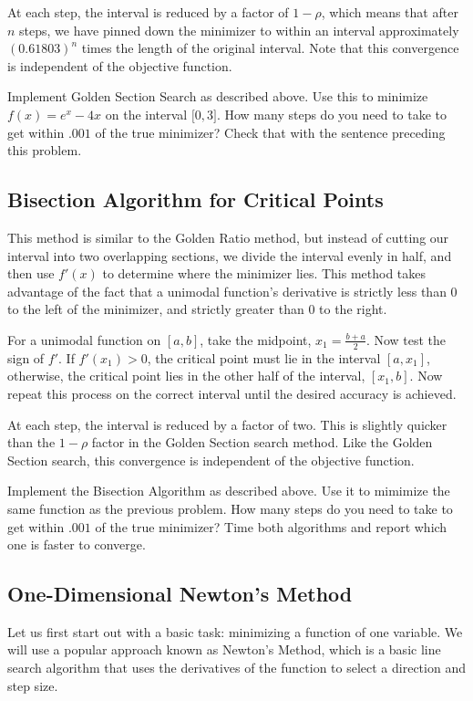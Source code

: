 At each step, the interval is reduced by a factor of $1-\rho$, which means that after
$n$ steps, we have pinned down the minimizer to within an interval approximately
$(0.61803)^n$ times the length of the original interval. Note that this convergence is
independent of the objective function.

\begin{problem}
Implement Golden Section Search as described above. Use this to minimize $f(x) = e^x - 4x$
on the interval $\lbrack 0, 3 \rbrack$. How many steps do you need to take to get
within $.001$ of the true minimizer? Check that with the sentence preceding this
problem.
\end{problem}

\subsection*{Bisection Algorithm for Critical Points}
This method is similar to the Golden Ratio method, but instead of cutting our interval into
two overlapping sections, we divide the interval evenly in half, and then use $f'(x)$ to determine where the minimizer lies.
This method takes advantage of the fact that a unimodal function's derivative is strictly less than
0 to the left of the minimizer, and strictly greater than 0 to the right.

For a unimodal function on $[a, b]$, take the midpoint, $x_1 = \frac{b + a}{2}$. Now test the sign
of $f'$. If $f'(x_1) > 0$, the critical point must lie in the interval $[a, x_1]$, otherwise,
the critical point lies in the other half of the interval, $[x_1, b]$. Now repeat this process on the
correct interval until the desired accuracy is achieved.

At each step, the interval is reduced by a factor of two. This is slightly quicker than the $1-\rho$ factor
in the Golden Section search method. Like the Golden Section search, this convergence is independent of the objective function.

\begin{problem}
Implement the Bisection Algorithm as described above. Use it to mimimize the same function as
the previous problem. How many steps do you need to take to get within $.001$ of the true minimizer?
Time both algorithms and report which one is faster to converge.
\end{problem}

\subsection*{One-Dimensional Newton's Method}
Let us first start out with a basic task: minimizing a function of one variable.
We will use a popular approach known as Newton's Method, which is a basic line search
algorithm that uses the derivatives of the function to select a direction and
step size.

